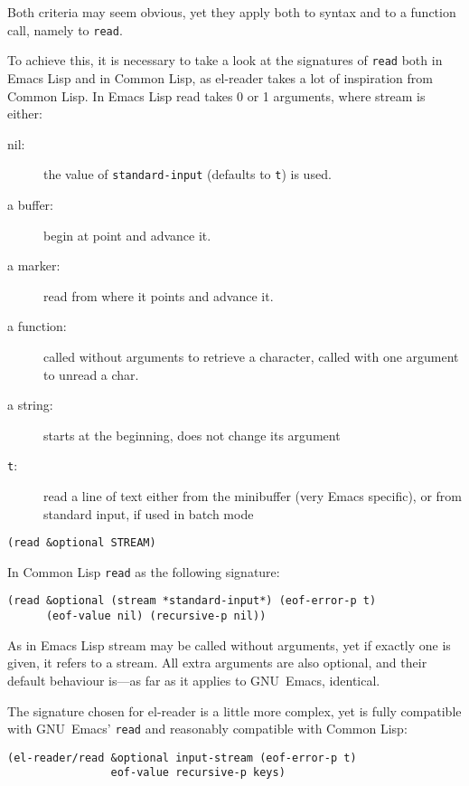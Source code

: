 \documentclass[a4paper,10pt,twoside]{report}
\newcommand{\el}{Emacs Lisp}
\newcommand{\cl}{Common Lisp}
\newcommand{\elr}{el-reader}
\newcommand{\sym}[1]{\texttt{#1}}
\newcommand{\fun}[1]{\texttt{#1}}
\newcommand{\emacs}{GNU~Emacs}
\newcommand{\Read}{\fun{read}}
\begin{document}
Both criteria may seem obvious, yet they apply both to syntax and to a function
call, namely to \Read{}.

To achieve this, it is necessary to take a look at the signatures of \Read{}
both in \el{} and in \cl{}, as \elr{} takes a lot of inspiration from \cl{}.  In
\el{} read takes 0 or 1 arguments, where stream is either:
\begin{description}
\item[nil:] the value of \sym{standard-input} (defaults to \sym{t}) is used.
\item[a buffer:] begin at point and advance it.
\item[a marker:] read from where it points and advance it.
\item[a function:] called without arguments to retrieve a character, called with
  one argument to unread a char.
\item[a string:] starts at the beginning, does not change its argument
\item[\sym{t}:] read a line of text either from the minibuffer (very Emacs
  specific), or from standard input, if used in batch mode
\end{description}

\begin{lstlisting}[style=lispinline]
(read &optional STREAM)
\end{lstlisting}

In \cl{} \Read{} as the following signature:

\begin{lstlisting}[style=lispinline]
(read &optional (stream *standard-input*) (eof-error-p t)
      (eof-value nil) (recursive-p nil))
\end{lstlisting}

As in \el{} stream may be called without arguments, yet if exactly one is given,
it refers to a stream.  All extra arguments are also optional, and their default
behaviour is---as far as it applies to \emacs{}, identical.

The signature chosen for \elr{} is a little more complex, yet is fully
compatible with \emacs{}’ \Read{} and reasonably compatible with \cl{}:

\begin{lstlisting}[style=lispinline]
(el-reader/read &optional input-stream (eof-error-p t)
                eof-value recursive-p keys)
\end{lstlisting}
\end{document}
